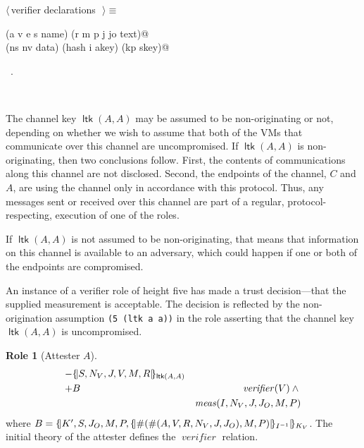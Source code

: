 \documentclass[titlepage,12pt]{article}
\theoremstyle{definition}
\newtheorem{role}{Role}
\newcommand{\inbnd}{\mathord -}
\newcommand{\outbnd}{\mathord +}
\DeclareMathOperator{\meas}{\mathit{meas}}
\DeclareMathOperator{\verifier}{\mathit{verifier}}
\DeclareMathOperator{\ltk}{\mathsf{ltk}}
\begin{document}
\begin{flushleft} \small
\begin{minipage}{\linewidth} \label{scrap20}
$\langle\,$verifier declarations\nobreak\ {\footnotesize {}}$\,\rangle\equiv$
\vspace{-1ex}
\begin{list}{}{} \item
\mbox{}\verb@(a v e s name) (r m p j jo text)@\\
\mbox{}\verb@(ns nv data) (hash i akey) (kp skey)@{\NWsep}
\end{list}
\vspace{-1ex}
\footnotesize\addtolength{\baselineskip}{-1ex}
\begin{list}{}{\setlength{\itemsep}{-\parsep}\setlength{\itemindent}{-\leftmargin}}
\item \NWtxtMacroRefIn\ .
\end{list}
\end{minipage}\\[4ex]
\end{flushleft}
The channel key ${\ltk(A,A)}$ may be assumed to be non-originating
or not, depending on whether we wish to assume that both of the
VMs that communicate over this channel are uncompromised. If
${\ltk(A,A)}$ is non-originating, then two conclusions follow.  First,
the contents of communications along this channel are not disclosed.
Second, the endpoints of the channel, $C$ and $A$, are using the
channel only in accordance with this protocol.  Thus, any messages
sent or received over this channel are part of a regular,
protocol-respecting, execution of one of the roles.

If ${\ltk(A,A)}$ is not assumed to be non-originating, that means
that information on this
channel is available to an adversary, which could happen if one or
both of the endpoints are compromised.

An instance of a verifier role of height five has made a trust
decision---that the supplied measurement is acceptable.  The decision
is reflected by the non-origination assumption \texttt{(5 (ltk a a))}
in the role asserting that the channel key $\ltk(A,A)$ is uncompromised.

\begin{role}[Attester $A$]
\begin{eqnarray}
&\inbnd\ctoaa\\
&\outbnd B&\verifier(V)\land{}\label{eq:attester 1}\\
&&\meas(I,N_V,J,J_O,M,P)\nonumber
\end{eqnarray}
where $B=\{\!|K',S,J_O,M,P, \{\!|\#(\#(A,V,R,N_V,J,J_O),M,P)|\!\}_{I^{-1}}|\!\}_{K_V}$.  The initial theory of the attester defines the
$\verifier$ relation.
\end{role}
\end{document}
